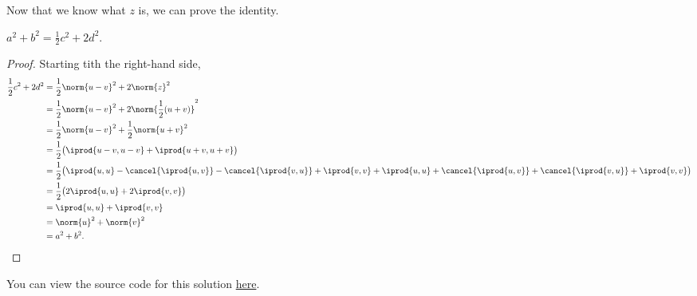 \documentclass{amsart}
\newcommand{\pagenum}{179}
\newcommand{\probnum}{31}
\begin{document}
Now that we know what $z$ is, we can prove the identity.
\begin{claim*}
    $a^2+b^2=\frac12c^2+2d^2.$
\end{claim*}
\begin{proof}
Starting tith the right-hand side,
\begin{align*}
    \frac12c^2+2d^2
    &= \frac12\norm{u-v}^2 + 2\norm{z}^2 \\
    &= \frac12\norm{u-v}^2 + 2\norm{\frac12(u+v)}^2 \\
    &= \frac12\norm{u-v}^2 + \frac12\norm{u+v}^2 \\
    &= \frac12\big(
        \iprod{u-v,u-v} + \iprod{u+v,u+v}
       \big) \\
    &= \frac12\big(
        \iprod{u,u} - \cancel{\iprod{u,v}} - \cancel{\iprod{v,u}} 
        + \iprod{v,v} +\iprod{u,u} +\cancel{\iprod{u,v}} +
        \cancel{\iprod{v,u}} + \iprod{v,v}
       \big) \\
    &= \frac12\big( 2\iprod{u,u}+2\iprod{v,v} \big) \\
    &= \iprod{u,u} + \iprod{v,v} \\
    &= \norm{u}^2 + \norm{v}^2 \\
    &= a^2 + b^2.\qedhere
\end{align*}
\end{proof}

\vspace{0.5in}

\begin{note*}
You can view the source code for this solution
\href{https://github.com/thomasbreydo/linalg/blob/main/\pagenum_\probnum_Thomas_Breydo.tex}
{here}.
\end{note*}
\end{document}
